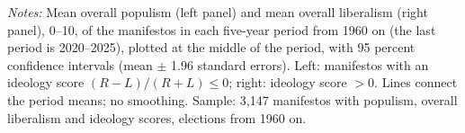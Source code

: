 \par\smallskip\begin{minipage}{\linewidth}\scriptsize\textit{Notes:} Mean overall populism (left panel) and mean overall liberalism (right panel), 0--10, of the manifestos in each five-year period from 1960 on (the last period is 2020--2025), plotted at the middle of the period, with 95 percent confidence intervals (mean $\pm$ 1.96 standard errors). Left: manifestos with an ideology score $(R-L)/(R+L) \le 0$; right: ideology score $> 0$. Lines connect the period means; no smoothing. Sample: 3,147 manifestos with populism, overall liberalism and ideology scores, elections from 1960 on.\end{minipage}
